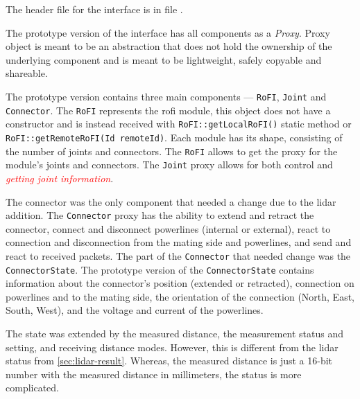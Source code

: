 \documentclass[
  digital,     %
  oneside,     %
  nosansbold,  %
  nocolorbold, %
  nolof,         %
  nolot,         %
]{fithesis4}
\newcommand{\TODO}[1]{\textcolor{red}{\textit{#1}}}
\begin{document}
{{{The header file for the interface is in file .

The prototype version of the interface has all components as a \emph{Proxy}. Proxy object is meant to be an abstraction that does not hold the ownership of the underlying component and is meant to be lightweight, safely copyable and shareable.

The prototype version contains three main components --- \lstinline[breakatwhitespace]|RoFI|, \lstinline|Joint| and \lstinline|Connector|. The \lstinline|RoFI| represents the \acrshort{rofi} module, this object does not have a constructor and is instead received with \lstinline|RoFI::getLocalRoFI()| static method or \lstinline|RoFI::getRemoteRoFI(Id remoteId)|. Each module has its shape, consisting of the number of joints and connectors. The \lstinline|RoFI| allows to get the proxy for the module's joints and connectors. The \lstinline|Joint| proxy allows for both control and \TODO{getting joint information}.

The connector was the only component that needed a change due to the \acrshort{lidar} addition. The \lstinline|Connector| proxy has the ability to extend and retract the connector, connect and disconnect powerlines (internal or external), react to connection and disconnection from the mating side and powerlines, and send and react to received packets. The part of the \lstinline|Connector| that needed change was the \lstinline|ConnectorState|. The prototype version of the \lstinline|ConnectorState| contains information about the connector's position (extended or retracted), connection on powerlines and to the mating side, the orientation of the connection (North, East, South, West), and the voltage and current of the powerlines.

The state was extended by the measured distance, the measurement status and setting, and receiving distance modes. However, this is different from the \acrshort{lidar} status from \autoref{sec:lidar-result}. Whereas, the measured distance is just a 16-bit number with the measured distance in millimeters, the status is more complicated.

}}}
\end{document}

